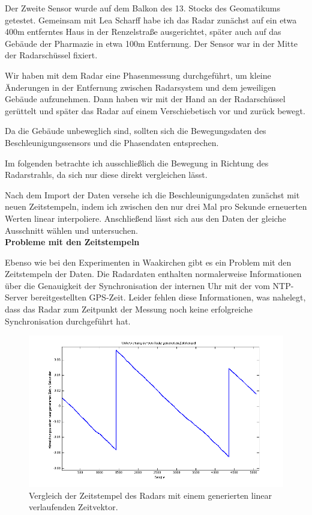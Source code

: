\documentclass[12pt,a4paper,twoside,BCOR=12.5mm]{scrartcl}
\begin{document}
Der Zweite Sensor wurde auf dem Balkon des 13. Stocks des Geomatikums getestet. Gemeinsam mit Lea Scharff habe ich das Radar zunächst auf ein etwa 400m entferntes Haus in der Renzelstraße ausgerichtet, später auch auf das Gebäude der Pharmazie in etwa 100m Entfernung. Der Sensor war in der Mitte der Radarschüssel fixiert. 

Wir haben mit dem Radar eine Phasenmessung durchgeführt, um kleine Änderungen in der Entfernung zwischen Radarsystem und dem jeweiligen Gebäude aufzunehmen. Dann haben wir mit der Hand an der Radarschüssel gerüttelt und später das Radar auf einem Verschiebetisch vor und zurück bewegt.

Da die Gebäude unbeweglich sind, sollten sich die Bewegungsdaten des Beschleunigungssensors und die Phasendaten entsprechen.

Im folgenden betrachte ich ausschließlich die Bewegung in Richtung des Radarstrahls, da sich nur diese direkt vergleichen lässt. 
 
 
 

Nach dem Import der Daten versehe ich die Beschleunigungsdaten zunächst mit neuen Zeitstempeln, indem ich zwischen den nur drei Mal pro Sekunde erneuerten Werten linear interpoliere.
Anschließend lässt sich aus den Daten der gleiche Ausschnitt wählen und untersuchen.\\

\textbf{Probleme mit den Zeitstempeln}

Ebenso wie bei den Experimenten in Waakirchen gibt es ein Problem mit den Zeitstempeln der Daten. Die Radardaten enthalten normalerweise Informationen über die Genauigkeit der Synchronisation der internen Uhr mit der vom NTP-Server bereitgestellten GPS-Zeit. Leider fehlen diese Informationen, was nahelegt, dass das Radar zum Zeitpunkt der Messung noch keine erfolgreiche Synchronisation  durchgeführt hat.



\begin{figure}[H]
\centering
\includegraphics[scale=.5]{geoauswertung/radarzeit.png}
\caption{Vergleich der Zeitstempel des Radars mit einem generierten linear verlaufenden Zeitvektor.}
\label{radarzeit}
\end{figure}
\end{document}
